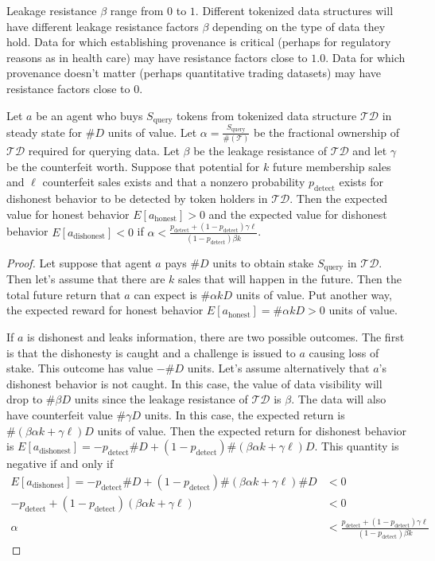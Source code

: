 \documentclass{llncs}
\begin{document}
Leakage resistance $\beta$ range from $0$ to $1$. Different tokenized data structures will have different leakage resistance factors $\beta$ depending on the type of data they hold. Data for which establishing provenance is critical (perhaps for regulatory reasons as in health care) may have resistance factors close to $1.0$. Data for which provenance doesn't matter (perhaps quantitative trading datasets) may have resistance factors close to $0$.

\begin{theorem} Let $a$ be an agent who buys $S_\text{query}$ tokens from tokenized data structure $\mathcal{TD}$ in steady state for $\#D$ units of value. Let $\alpha = \frac{S_\text{query}}{\#(\mathcal{T})}$ be the fractional ownership of $\mathcal{TD}$ required for querying data. Let $\beta$ be the leakage resistance of $\mathcal{TD}$ and let $\gamma$ be the counterfeit worth. Suppose that potential for $k$ future membership sales and $\ell$ counterfeit sales exists and that a nonzero probability $p_\text{detect}$ exists for dishonest behavior to be detected by token holders in $\mathcal{TD}$. Then the expected value for honest behavior $E[a_\text{honest}] > 0$ and the expected value for dishonest behavior $E[a_\text{dishonest}] < 0$ if $\alpha < \frac{p_\text{detect} + (1-p_\text{detect})\gamma \ell}{(1-p_\text{detect})\beta k}$.
\end{theorem}
\begin{proof}
Let suppose that agent $a$ pays $\#D$ units to obtain stake $S_\text{query}$ in $\mathcal{TD}$. Then let's assume that there are $k$ sales that will happen in the future. Then the total future return that $a$ can expect is $\#\alpha kD$ units of value. Put another way, the expected reward for honest behavior $E[a_\text{honest}] = \#\alpha k D > 0$ units of value.

If $a$ is dishonest and leaks information, there are two possible outcomes. The first is that the dishonesty is caught and a challenge is issued to $a$ causing loss of stake. This outcome has value $-\#D$ units. Let's assume alternatively that $a$'s dishonest behavior is not caught. In this case, the value of data visibility will drop to $\#\beta D$ units since the leakage resistance of $\mathcal{TD}$ is $\beta$. The data will also have counterfeit value $\# \gamma D$ units. In this case, the expected return is $\#(\beta \alpha k + \gamma \ell) D$ units of value. Then the expected return for dishonest behavior is $E[a_\text{dishonest}] = -p_{\text{detect}} \#D + (1-p_\text{detect}) \#(\beta \alpha k + \gamma \ell) D$. This quantity is negative if and only if
\begin{align*}
    E[a_\text{dishonest}] = -p_{\text{detect}} \#D + (1-p_\text{detect}) \#(\beta \alpha k + \gamma \ell) \#D &< 0 \\
     -p_\text{detect} + (1 - p_\text{detect})(\beta \alpha k + \gamma \ell) &< 0 \\
     \alpha &< \frac{p_\text{detect} + (1-p_\text{detect})\gamma \ell}{(1-p_\text{detect})\beta k}
\end{align*}
\end{proof}
\end{document}
